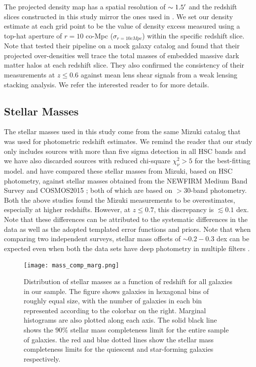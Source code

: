 The projected density map has a spatial resolution of $\sim1.5\mbox{$^\prime$}$ and the redshift slices constructed in this study mirror the ones used in \citet{hsc_den}. We set our density estimate at each grid point to be the value of density excess measured using a top-hat aperture of $r=10$ co-Mpc ($\sigma_{r=10 cMpc}$) within the specific redshift slice. Note that \citet{hsc_den} tested their pipeline on a mock galaxy catalog and found that their projected over-densities well trace the total masses of embedded massive dark matter halos at each redshift slice. They also confirmed the consistency of their measurements at $z \leq 0.6$ against mean lens shear signals from a weak lensing stacking analysis. We refer the interested reader to \citet{hsc_den} for more details. 

\subsection{Stellar Masses} \label{sec_c4:mass_completeness}
The stellar masses used in this study come from the same Mizuki catalog that was used for photometric redshift estimates. We remind the reader that our study only includes sources with more than five sigma detection in all HSC bands and we have also discarded sources with reduced chi-square $\chi_{\nu}^2 > 5$ for the best-fitting model. \citet{hsc_photoz_pdr1} and \citet{hsc_morph_den} have compared these stellar masses from Mizuki, based on HSC \gb{}\rb\ib\zb\yb photometry, against stellar masses obtained from the NEWFIRM Medium Band Survey \citep{newfirm} and COSMOS2015 \citep{cosmos_2015}; both of which are based on $>30$-band photometry. Both the above studies found the Mizuki measurements to be overestimates, especially at higher redshifts. However, at $z \leq 0.7$, this discrepancy is $\lesssim0.1$ dex. Note that these differences can be attributed to the systematic differences in the data as well as the adopted templated error functions and priors. Note that when comparing two independent surveys, stellar mass offsets of $\sim0.2-0.3$ dex can be expected even when both the data sets have deep photometry in multiple filters \citep{dokkum_14}.

\begin{figure}[htb]
    \centering
    \texttt{[image: mass\_comp\_marg.png]}
    \caption{Distribution of stellar masses as a function of redshift for all galaxies in our sample. The figure shows galaxies in hexagonal bins of roughly equal size, with the number of galaxies in each bin represented according to the colorbar on the right. Marginal histograms are also plotted along each axis. The solid black line shows the $90\%$ stellar mass completeness limit for the entire sample of galaxies. the red and blue dotted lines show the stellar mass completeness limits for the quiescent and star-forming galaxies respectively.}
    \label{fig_c4:mass_comp}
\end{figure}

